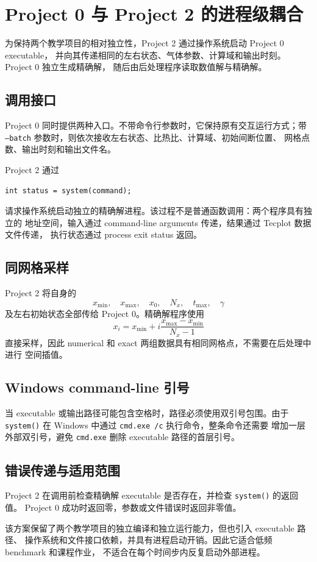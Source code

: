 \section{Project 0 与 Project 2 的进程级耦合}

为保持两个教学项目的相对独立性，Project 2 通过操作系统启动 Project 0 executable，
并向其传递相同的左右状态、气体参数、计算域和输出时刻。Project 0 独立生成精确解，
随后由后处理程序读取数值解与精确解。

\subsection{调用接口}

Project 0 同时提供两种入口。不带命令行参数时，它保持原有交互运行方式；带
\texttt{--batch} 参数时，则依次接收左右状态、比热比、计算域、初始间断位置、
网格点数、输出时刻和输出文件名。

Project 2 通过
\begin{lstlisting}
int status = system(command);
\end{lstlisting}
请求操作系统启动独立的精确解进程。该过程不是普通函数调用：两个程序具有独立的
地址空间，输入通过 command-line arguments 传递，结果通过 Tecplot 数据文件传递，
执行状态通过 process exit status 返回。

\subsection{同网格采样}

Project 2 将自身的
\[
x_{\min},\quad x_{\max},\quad x_0,\quad N_x,\quad t_{\max},\quad \gamma
\]
及左右初始状态全部传给 Project 0。精确解程序使用
\[
x_i=x_{\min}+i\frac{x_{\max}-x_{\min}}{N_x-1}
\]
直接采样，因此 numerical 和 exact 两组数据具有相同网格点，不需要在后处理中进行
空间插值。

\subsection{Windows command-line 引号}

当 executable 或输出路径可能包含空格时，路径必须使用双引号包围。由于
\texttt{system()} 在 Windows 中通过 \texttt{cmd.exe /c} 执行命令，整条命令还需要
增加一层外部双引号，避免 \texttt{cmd.exe} 删除 executable 路径的首层引号。

\subsection{错误传递与适用范围}

Project 2 在调用前检查精确解 executable 是否存在，并检查 \texttt{system()} 的返回值。
Project 0 成功时返回零，参数或文件错误时返回非零值。

该方案保留了两个教学项目的独立编译和独立运行能力，但也引入 executable 路径、
操作系统和文件接口依赖，并具有进程启动开销。因此它适合低频 benchmark 和课程作业，
不适合在每个时间步内反复启动外部进程。
